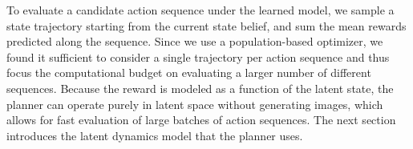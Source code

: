 To evaluate a candidate action sequence under the learned model, we sample a state trajectory starting from the current state belief, and sum the mean rewards predicted along the sequence. Since we use a population-based optimizer, we found it sufficient to consider a single trajectory per action sequence and thus focus the computational budget on evaluating a larger number of different sequences. Because the reward is modeled as a function of the latent state, the planner can operate purely in latent space without generating images, which allows for fast evaluation of large batches of action sequences. The next section introduces the latent dynamics model that the planner uses.

